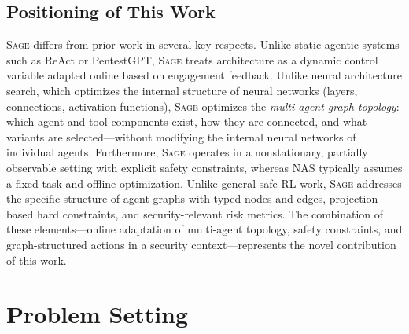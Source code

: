 \documentclass[sigconf,anonymous]{acmart}
\newcommand{\SAGE}{\textsc{Sage}\xspace}
\begin{document}
\subsection{Positioning of This Work}

\SAGE differs from prior work in several key respects. Unlike static agentic systems such as ReAct or PentestGPT, \SAGE treats architecture as a dynamic control variable adapted online based on engagement feedback. Unlike neural architecture search, which optimizes the internal structure of neural networks (layers, connections, activation functions), \SAGE optimizes the \emph{multi-agent graph topology}: which agent and tool components exist, how they are connected, and what variants are selected---without modifying the internal neural networks of individual agents. Furthermore, \SAGE operates in a nonstationary, partially observable setting with explicit safety constraints, whereas NAS typically assumes a fixed task and offline optimization. Unlike general safe RL work, \SAGE addresses the specific structure of agent graphs with typed nodes and edges, projection-based hard constraints, and security-relevant risk metrics. The combination of these elements---online adaptation of multi-agent topology, safety constraints, and graph-structured actions in a security context---represents the novel contribution of this work.

\section{Problem Setting}
\label{sec:problem}
\end{document}
